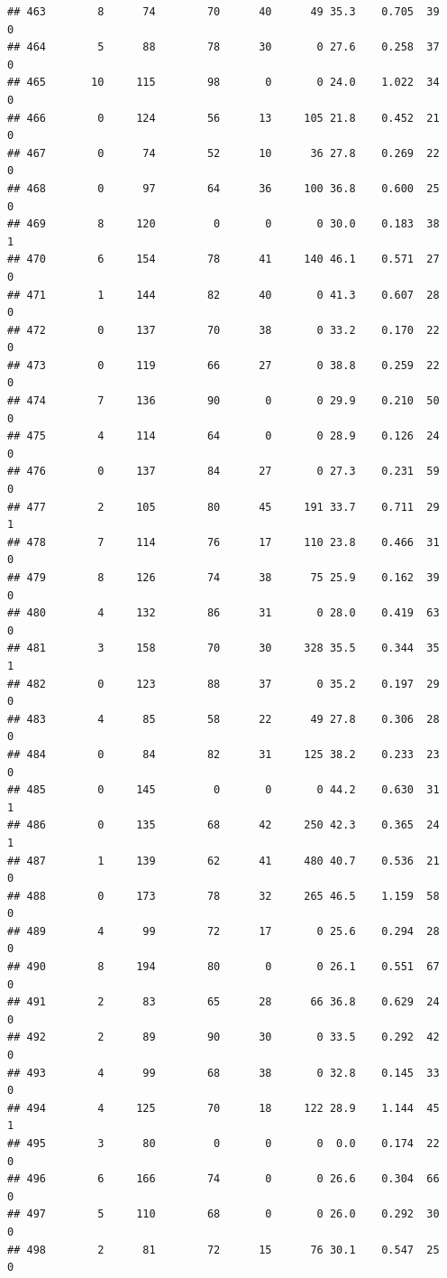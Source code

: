 \documentclass[11pt, a4paper]{article}\usepackage[]{graphicx}\usepackage[]{xcolor}
\makeatletter
\newenvironment{kframe}{%
 \def\at@end@of@kframe{}%
 \ifinner\ifhmode%
  \def\at@end@of@kframe{\end{minipage}}%
  \begin{minipage}{\columnwidth}%
 \fi\fi%
 \def\FrameCommand##1{\hskip\@totalleftmargin \hskip-\fboxsep
 \colorbox{shadecolor}{##1}\hskip-\fboxsep
     \hskip-\linewidth \hskip-\@totalleftmargin \hskip\columnwidth}%
 \MakeFramed {\advance\hsize-\width
   \@totalleftmargin\z@ \linewidth\hsize
   \@setminipage}}%
 {\par\unskip\endMakeFramed%
 \at@end@of@kframe}
\newenvironment{knitrout}{}{} %
\makeatother
\begin{document}
\begin{knitrout}
\begin{kframe}
\begin{verbatim}
## 463        8      74        70      40      49 35.3    0.705  39    0
## 464        5      88        78      30       0 27.6    0.258  37    0
## 465       10     115        98       0       0 24.0    1.022  34    0
## 466        0     124        56      13     105 21.8    0.452  21    0
## 467        0      74        52      10      36 27.8    0.269  22    0
## 468        0      97        64      36     100 36.8    0.600  25    0
## 469        8     120         0       0       0 30.0    0.183  38    1
## 470        6     154        78      41     140 46.1    0.571  27    0
## 471        1     144        82      40       0 41.3    0.607  28    0
## 472        0     137        70      38       0 33.2    0.170  22    0
## 473        0     119        66      27       0 38.8    0.259  22    0
## 474        7     136        90       0       0 29.9    0.210  50    0
## 475        4     114        64       0       0 28.9    0.126  24    0
## 476        0     137        84      27       0 27.3    0.231  59    0
## 477        2     105        80      45     191 33.7    0.711  29    1
## 478        7     114        76      17     110 23.8    0.466  31    0
## 479        8     126        74      38      75 25.9    0.162  39    0
## 480        4     132        86      31       0 28.0    0.419  63    0
## 481        3     158        70      30     328 35.5    0.344  35    1
## 482        0     123        88      37       0 35.2    0.197  29    0
## 483        4      85        58      22      49 27.8    0.306  28    0
## 484        0      84        82      31     125 38.2    0.233  23    0
## 485        0     145         0       0       0 44.2    0.630  31    1
## 486        0     135        68      42     250 42.3    0.365  24    1
## 487        1     139        62      41     480 40.7    0.536  21    0
## 488        0     173        78      32     265 46.5    1.159  58    0
## 489        4      99        72      17       0 25.6    0.294  28    0
## 490        8     194        80       0       0 26.1    0.551  67    0
## 491        2      83        65      28      66 36.8    0.629  24    0
## 492        2      89        90      30       0 33.5    0.292  42    0
## 493        4      99        68      38       0 32.8    0.145  33    0
## 494        4     125        70      18     122 28.9    1.144  45    1
## 495        3      80         0       0       0  0.0    0.174  22    0
## 496        6     166        74       0       0 26.6    0.304  66    0
## 497        5     110        68       0       0 26.0    0.292  30    0
## 498        2      81        72      15      76 30.1    0.547  25    0

\end{verbatim}
\end{kframe}
\end{knitrout}
\end{document}
